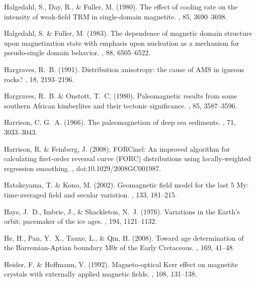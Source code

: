 \documentclass[11pt]{book}
\begin{document}
\begin{thebibliography}{}
Halgedahl, S., Day, R., \& Fuller, M. (1980).
\newblock The effect of cooling rate on the intensity of weak-field TRM in
  single-domain magnetite.
, 85, 3690--3698.

Halgedahl, S. \& Fuller, M. (1983).
\newblock The dependence of magnetic domain structure upon magnetization state
  with emphasis upon nucleation as a mechanism for pseudo-single domain
  behavior.
, 88, 6505--6522.

Hargraves, R.~B. (1991).
\newblock Distribution anisotropy: the cause of {AMS} in igneous rocks?
, 18, 2193--2196.

Hargraves, R.~B. \& Onstott, T.~C. (1980).
\newblock Paleomagnetic results from some southern African kimberlites and
  their tectonic significance.
, 85, 3587--3596.

Harrison, C. G.~A. (1966).
\newblock The paleomagnetism of deep sea sediments.
, 71, 3033--3043.

Harrison, R. \& Feinberg, J. (2008).
\newblock FORCinel: An improved algorithm for calculating first-order reversal
  curve (FORC) distributions using locally-weighted regression smoothing.
, doi:10.1029/2008GC001987.

Hatakeyama, T. \& Kono, M. (2002).
\newblock Geomagnetic field model for the last 5 My: time-averaged field and
  secular variation.
, 133, 181--215.

Hays, J.~D., Imbrie, J., \& Shackleton, N.~J. (1976).
\newblock Variations in the Earth's orbit: pacemaker of the ice ages.
, 194, 1121--1132.

He, H., Pan, Y.~X., Tauxe, L., \& Qin, H. (2008).
\newblock Toward age determination of the Barremian-Aptian boundary M0r of the
  Early Cretaceous.
, 169, 41--48.

Heider, F. \& Hoffmann, V. (1992).
\newblock Magneto-optical Kerr effect on magnetite crystals with externally
  applied magnetic fields.
, 108, 131–138.


\end{thebibliography}
\end{document}
